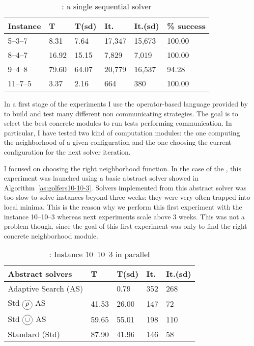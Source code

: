 \begin{table}[h]
\centering
\renewcommand{\arraystretch}{1}
\begin{tabular}{p{1.5cm}|R{1.5cm}R{1.5cm}R{1.5cm}R{1.5cm}R{2.5cm}}
\hline
{\bf Instance} & T & T(sd) & It. & It.(sd) & \% success\\
\hline
5--3--7 & 8.31 & 7.64 & 17,347 & 15,673 & 100.00\\
8--4--7 & 16.92 & 15.15 & 7,829 & 7,019 & 100.00\\
9--4--8 & 79.60 & 64.07 & 20,779 & 16,537 & 94.28\\
11--7--5 & 3.37 & 2.16 & 664 & 380 & 100.00\\
\hline
\end{tabular}
\caption{\sg: a single sequential solver}
\label{tab:golfers_seq}
\end{table}

In a first stage of the experiments I use the operator-based language provided by \posl{} to build and test many different non communicating strategies. The goal is to select the best concrete modules to run tests performing communication. In particular, I have tested two kind of computation modules: the one computing the neighborhood of a given configuration and the one choosing the current configuration for the next solver iteration.

I focused on choosing the right neighborhood function. In the case of the \sgp, this experiment was launched using a basic abstract solver showed in Algorithm~\ref{as:golfers10-10-3}.
Solvers implemented from this abstract solver was too slow to solve instances beyond three weeks: they were very often trapped into local minima. This is the reason why we perform this first experiment with the instance 10--10--3 whereas next experiments scale above 3 weeks. This was not a problem though, since the goal of this first experiment was only to find the right concrete neighborhood module.

\begin{table}
\centering 
\renewcommand{\arraystretch}{1}
\begin{tabular}{p{4cm}|R{1.3cm}R{1.3cm}R{1.3cm}R{1.3cm}}
\hline
{\bf Abstract solvers} & T & T(sd) & It. & It.(sd) \\
\hline
Adaptive Search (AS) &  & 0.79 & 352 & 268 \\		
Std $\circled{$\rho$}$ AS & 41.53 & 26.00 & 147 & 72\\
Std $\circled{$\cup$}$ AS & 59.65 & 55.01 & 198 & 110\\
Standard (Std) & 87.90 & 41.96 & 146 & 58 \\
\hline
\end{tabular}
\caption{\sg: Instance 10--10--3 in parallel}
\label{tab:golfers10-10-3}
\end{table}

